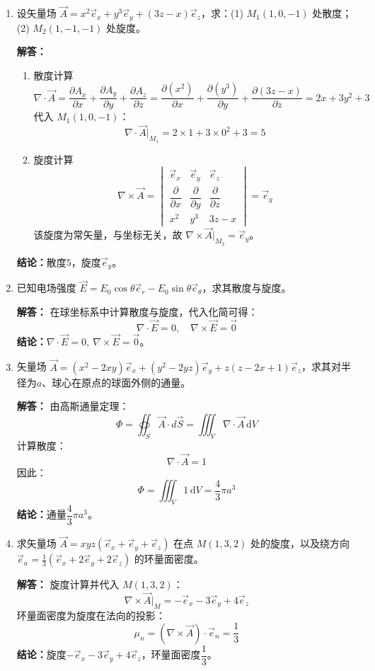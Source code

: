 \begin{enumerate}[label=\arabic*.,itemsep=10pt,topsep=5pt,parsep=2pt]
\item 设矢量场 $\vec{A} = x^2\vec{e}_x + y^3\vec{e}_y + (3z - x)\vec{e}_z$，求：(1) $M_1(1,0,-1)$ 处散度；(2) $M_2(1,-1,-1)$ 处旋度。

\textbf{解答：}
\begin{enumerate}[label=(\arabic*),itemsep=5pt,topsep=2pt,parsep=2pt]
\item 散度计算
\[
\nabla\cdot\vec{A} 
=\frac{\partial A_x}{\partial x}+\frac{\partial A_y}{\partial y}+\frac{\partial A_z}{\partial z}
=\frac{\partial(x^2)}{\partial x}+\frac{\partial(y^3)}{\partial y}+\frac{\partial(3z-x)}{\partial z}
=2x+3y^2+3
\]
代入 $M_1(1,0,-1)$：
\[
\nabla\cdot\vec{A}\big|_{M_1}=2\times 1+3\times 0^2+3=5
\]

\item 旋度计算
\[
\nabla\times\vec{A} =
\begin{vmatrix}
\vec{e}_x & \vec{e}_y & \vec{e}_z \\
\dfrac{\partial}{\partial x} & \dfrac{\partial}{\partial y} & \dfrac{\partial}{\partial z} \\
x^2 & y^3 & 3z-x
\end{vmatrix}
=\vec{e}_y
\]
该旋度为常矢量，与坐标无关，故 $\nabla\times\vec{A}\big|_{M_2}=\vec{e}_y$。
\end{enumerate}
\textbf{结论：}散度$\boxed{5}$，旋度$\boxed{\vec{e}_y}$。

\item 已知电场强度 $\vec{E} = E_0\cos\theta\vec{e}_r - E_0\sin\theta\vec{e}_\theta$，求其散度与旋度。

\textbf{解答：}
在球坐标系中计算散度与旋度，代入化简可得：
\[
\nabla\cdot\vec{E} = 0,\quad \nabla\times\vec{E} = \vec{0}
\]
\textbf{结论：}$\boxed{\nabla\cdot\vec{E}=0,\ \nabla\times\vec{E}=\vec{0}}$。

\item 矢量场 $\vec{A}=(x^2-2xy)\vec{e}_x+(y^2-2yz)\vec{e}_y+z(z-2x+1)\vec{e}_z$，求其对半径为$a$、球心在原点的球面外侧的通量。

\textbf{解答：}
由高斯通量定理：
\[
\varPhi=\oiint_S \vec{A}\cdot d\vec{S}=\iiint_V \nabla\cdot\vec{A}\,\mathrm{d}V
\]
计算散度：
\[
\nabla\cdot\vec{A}=1
\]
因此：
\[
\varPhi=\iiint_V 1\,\mathrm{d}V=\frac{4}{3}\pi a^3
\]
\textbf{结论：}通量$\boxed{\dfrac{4}{3}\pi a^3}$。

\item 求矢量场 $\vec{A}=xyz(\vec{e}_x+\vec{e}_y+\vec{e}_z)$ 在点 $M(1,3,2)$ 处的旋度，以及绕方向 $\vec{e}_n=\frac{1}{3}(\vec{e}_x+2\vec{e}_y+2\vec{e}_z)$ 的环量面密度。

\textbf{解答：}
旋度计算并代入 $M(1,3,2)$：
\[
\nabla\times\vec{A}\big|_M
=-\vec{e}_x-3\vec{e}_y+4\vec{e}_z
\]
环量面密度为旋度在法向的投影：
\[
\mu_n=(\nabla\times\vec{A})\cdot\vec{e}_n
=\frac{1}{3}
\]
\textbf{结论：}旋度$\boxed{-\vec{e}_x-3\vec{e}_y+4\vec{e}_z}$，环量面密度$\boxed{\dfrac{1}{3}}$。

\end{enumerate}